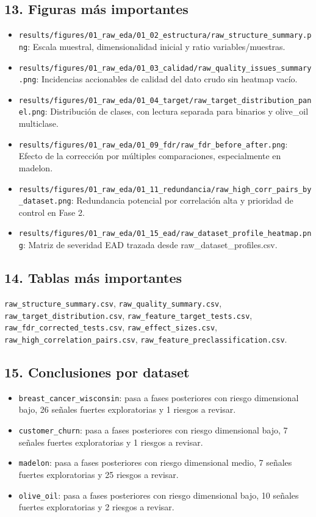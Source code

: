 \subsection{13. Figuras más importantes}
\begin{itemize}
\item \texttt{results/figures/01\_raw\_eda/01\_02\_estructura/raw\_structure\_summary.png}: Escala muestral, dimensionalidad inicial y ratio variables/muestras.
\item \texttt{results/figures/01\_raw\_eda/01\_03\_calidad/raw\_quality\_issues\_summary.png}: Incidencias accionables de calidad del dato crudo sin heatmap vacío.
\item \texttt{results/figures/01\_raw\_eda/01\_04\_target/raw\_target\_distribution\_panel.png}: Distribución de clases, con lectura separada para binarios y olive\_oil multiclase.
\item \texttt{results/figures/01\_raw\_eda/01\_09\_fdr/raw\_fdr\_before\_after.png}: Efecto de la corrección por múltiples comparaciones, especialmente en madelon.
\item \texttt{results/figures/01\_raw\_eda/01\_11\_redundancia/raw\_high\_corr\_pairs\_by\_dataset.png}: Redundancia potencial por correlación alta y prioridad de control en Fase 2.
\item \texttt{results/figures/01\_raw\_eda/01\_15\_ead/raw\_dataset\_profile\_heatmap.png}: Matriz de severidad EAD trazada desde raw\_dataset\_profiles.csv.
\end{itemize}

\subsection{14. Tablas más importantes}
\texttt{raw\_structure\_summary.csv}, \texttt{raw\_quality\_summary.csv}, \texttt{raw\_target\_distribution.csv}, \texttt{raw\_feature\_target\_tests.csv}, \texttt{raw\_fdr\_corrected\_tests.csv}, \texttt{raw\_effect\_sizes.csv}, \texttt{raw\_high\_correlation\_pairs.csv}, \texttt{raw\_feature\_preclassification.csv}.
\subsection{15. Conclusiones por dataset}
\begin{itemize}
\item \texttt{breast\_cancer\_wisconsin}: pasa a fases posteriores con riesgo dimensional bajo, 26 señales fuertes exploratorias y 1 riesgos a revisar.
\item \texttt{customer\_churn}: pasa a fases posteriores con riesgo dimensional bajo, 7 señales fuertes exploratorias y 1 riesgos a revisar.
\item \texttt{madelon}: pasa a fases posteriores con riesgo dimensional medio, 7 señales fuertes exploratorias y 25 riesgos a revisar.
\item \texttt{olive\_oil}: pasa a fases posteriores con riesgo dimensional bajo, 10 señales fuertes exploratorias y 2 riesgos a revisar.
\end{itemize}

